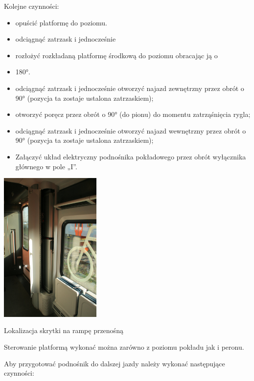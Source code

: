 Kolejne czynności:

\begin{itemize}
	\item opuścić platformę do poziomu.
	\item odciągnąć zatrzask i jednocześnie
	\item rozłożyć rozkładaną platformę środkową do poziomu obracając ją o
	\item 180°.
	\item odciągnąć zatrzask i jednocześnie otworzyć najazd zewnętrzny przez obrót o 90° (pozycja ta zostaje ustalona zatrzaskiem);
	\item otworzyć poręcz przez obrót o 90° (do pionu) do momentu  zatrząśnięcia rygla;
	\item odciągnąć zatrzask i jednocześnie otworzyć najazd wewnętrzny przez obrót o 90° (pozycja ta zostaje ustalona zatrzaskiem);
	\item Załączyć układ elektryczny podnośnika pokładowego przez obrót wyłącznika głównego w pole „I”.
\end{itemize}
\begin{marginfigure}
	\includegraphics[width=5cm]{skryptkierownik-img/skryptkierownik-img053.jpg}
	\caption{Lokalizacja skrytki na rampę przenośną}
\end{marginfigure}
Sterowanie platformą wykonać można zarówno z poziomu pokładu jak i peronu.

Aby przygotować podnośnik do dalszej jazdy należy wykonać następujące czynności:

